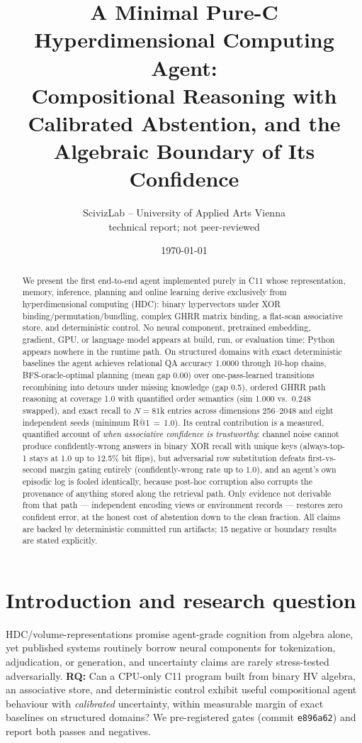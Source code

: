 \documentclass[10pt,twocolumn]{article}
\title{\bf A Minimal Pure-C Hyperdimensional Computing Agent:\\ Compositional Reasoning with Calibrated Abstention, and the Algebraic Boundary of Its Confidence}
\author{ScivizLab -- University of Applied Arts Vienna\\ \small technical report; not peer-reviewed}
\date{\today}
\begin{document}
\maketitle
\begin{abstract}
We present the first end-to-end agent implemented purely in C11 whose representation, memory, inference, planning and online learning derive exclusively from hyperdimensional computing (HDC): binary hypervectors under XOR binding/permutation/bundling, complex GHRR matrix binding, a flat-scan associative store, and deterministic control. No neural component, pretrained embedding, gradient, GPU, or language model appears at build, run, or evaluation time; Python appears nowhere in the runtime path. On structured domains with exact deterministic baselines the agent achieves relational QA accuracy 1.0000 through 10-hop chains, BFS-oracle-optimal planning (mean gap 0.00) over one-pass-learned transitions recombining into detours under missing knowledge (gap 0.5), ordered GHRR path reasoning at coverage 1.0 with quantified order semantics (sim 1.000 vs.\ 0.248 swapped), and exact recall to $N{=}81$k entries across dimensions 256--2048 and eight independent seeds (minimum R@1\,$=$\,1.0). Its central contribution is a measured, quantified account of \emph{when associative confidence is trustworthy}: channel noise cannot produce confidently-wrong answers in binary XOR recall with unique keys (always-top-1 stays at 1.0 up to 12.5\% bit flips), but adversarial row substitution defeats first-vs-second margin gating entirely (confidently-wrong rate up to 1.0), and an agent's own episodic log is fooled identically, because post-hoc corruption also corrupts the provenance of anything stored along the retrieval path. Only evidence not derivable from that path --- independent encoding views or environment records --- restores zero confident error, at the honest cost of abstention down to the clean fraction. All claims are backed by deterministic committed run artifacts; 15 negative or boundary results are stated explicitly.
\end{abstract}

\section{Introduction and research question}
HDC/volume-representations promise agent-grade cognition from algebra alone, yet published systems routinely borrow neural components for tokenization, adjudication, or generation, and uncertainty claims are rarely stress-tested adversarially. \textbf{RQ:} Can a CPU-only C11 program built from binary HV algebra, an associative store, and deterministic control exhibit useful compositional agent behaviour with \emph{calibrated} uncertainty, within measurable margin of exact baselines on structured domains? We pre-registered gates (commit {\tt e896a62}) and report both passes and negatives.
\end{document}
